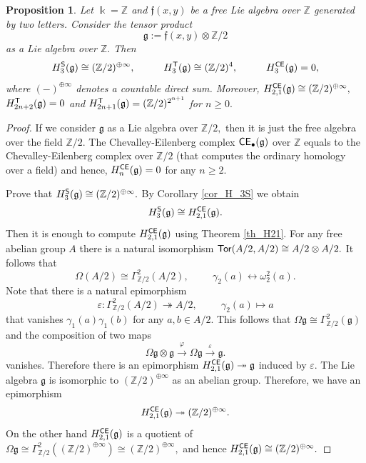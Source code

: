 \documentclass{amsart}
\numberwithin{equation}{section}
\newtheorem{proposition}[theorem]{Proposition}
\theoremstyle{definition}
\def\epi{\twoheadrightarrow}
\def\gg{\mathfrak{g}}
\def\ff{\mathfrak{f}}
\def\kk{\Bbbk}
\def\ZZ{\mathbb{Z}}
\begin{document}
\begin{proposition}\label{proposition_main_example}
Let $\kk=\ZZ$ and $\ff(x,y)$ be a free Lie algebra over $\ZZ$ generated by two letters. Consider the tensor product 
$$\gg:=\ff(x,y)\otimes \ZZ/2$$
as a Lie algebra over $\ZZ.$ Then
$$H_3^{\sf S}(\gg)\cong  (\ZZ/2)^{\oplus \infty}, \hspace{1cm} H_3^{\sf T}(\gg)\cong (\ZZ/2)^4, \hspace{1cm} H_3^{\sf CE}(\gg)=0,$$
where $(-)^{\oplus \infty}$ denotes a countable direct sum.
Moreover, $H^{\sf CE}_{2,1}(\gg ) \cong (\ZZ/2)^{\oplus \infty},$ $H^{\sf T}_{2n+2}(\gg)=0$ and $H^{\sf T}_{2n+1}(\gg)=(\ZZ/2)^{2^{n+1}}$ for $n\geq 0.$ 
\end{proposition}
\begin{proof}
If we consider $\gg$ as a Lie algebra over $\ZZ/2,$ then it is just the free algebra over the field  $\ZZ/2.$ The Chevalley-Eilenberg complex ${\sf CE}_\bullet(\gg)$ over $\ZZ$ equals to the Chevalley-Eilenberg complex over $\ZZ/2$ (that computes the ordinary homology over a field) and hence, $H_n^{\sf CE}(\gg)=0$ for any $n\geq 2.$ 

Prove that $H^{\sf S}_3(\gg)\cong (\ZZ/2)^{\oplus \infty}.$ By Corollary \ref{cor_H_3S} we obtain 
$$H_3^{\sf S}(\gg)\cong H^{\sf CE}_{2,1}(\gg).$$
Then it is enough to compute $H^{\sf CE}_{2,1}(\gg)$ using Theorem \ref{th_H21}. For any free abelian group $A$ there is a natural isomorphism ${\sf Tor}(A/2,A/2)\cong A/2\otimes A/2.$ It follows that $$ \Omega (A/2) \cong   \Gamma^2_{\ZZ/2}(A/2),\hspace{1cm} \gamma_2(a) \leftrightarrow \omega_2^2(a).$$ Note that there is a natural epimorphism 
$$\varepsilon: \Gamma^2_{\ZZ/2}(A/2) \epi A/2, \hspace{1cm} \gamma_2(a)\mapsto a$$
that vanishes $\gamma_1(a)\gamma_1(b)$ for any $a,b\in A/2.$
This follows that 
$\Omega \gg\cong\Gamma^2_{\ZZ/2}(\gg)$ and the composition of two maps 
$$\Omega \gg \otimes \gg \overset{\varphi}\longrightarrow \Omega \gg \overset{\varepsilon}\longrightarrow \gg.$$
vanishes. Therefore there is an epimorphism 
$H^{\sf CE}_{2,1}(\gg)\epi \gg$
induced by $\varepsilon.$ The Lie algebra $\gg$ is isomorphic to $(\ZZ/2)^{\oplus \infty}$ as an abelian group. Therefore, we have an epimorphism 
$$H^{\sf CE}_{2,1}(\gg)\epi (\ZZ/2)^{\oplus \infty}.$$
On the other hand $H^{\sf CE}_{2,1}(\gg)$ is a quotient of $\Omega \gg \cong \Gamma^2_{\ZZ/2}((\ZZ/2)^{\oplus \infty})\cong (\ZZ/2)^{\oplus \infty},$ and hence $H^{\sf CE}_{2,1}(\gg)\cong (\ZZ/2)^{\oplus \infty}.$ 


\end{proof}
\end{document}
